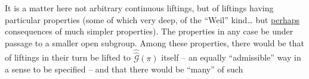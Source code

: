 It is a matter here not  arbitrary continuous liftings, but of liftings having particular properties (some of which very deep, of the ``Weil'' kind\ldots\deleted{)} but \uline{perhaps} consequences of much simpler properties). The properties   in any case be   under passage to a smaller open subgroup. Among these properties, there would be that   of liftings  in their turn be lifted to $\widehat{\widehat{\mathcal G}}(\pi)$ itself --  an equally ``admissible'' way in a sense to be specified -- and  that there would be ``many''  of such
